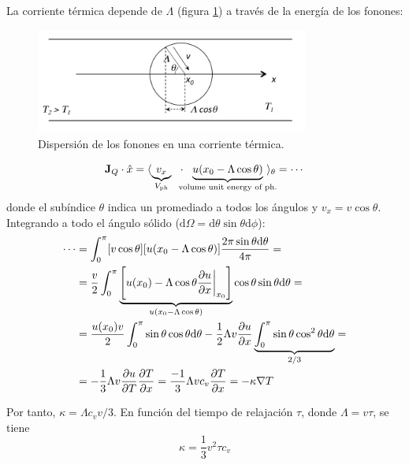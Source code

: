 La corriente térmica depende de $\Lambda$ (figura \ref{fig:jcurrent})
a través de la energía de los fonones:
\begin{figure}
  \centering
  \includegraphics[width=0.8\textwidth]{figures/jcurrent.png}
  \caption{Dispersión de los fonones en una corriente térmica.}
  \label{fig:jcurrent}
\end{figure}

\begin{equation}
  \mathbf{J}_Q \cdot \hat x = \langle
  \underbrace{v_x}_{\mathclap{V_\text{ph}}} \ \ \cdot \ \ \underbrace{u(x_0
  - \Lambda \cos \theta)}_{\mathclap{\text{volume unit energy of
      ph.}}} \ \rangle_\theta = \cdots
\end{equation}
donde el subíndice $\theta$ indica un promediado a todos los
ángulos y $v_x = v\cos \theta$. Integrando a todo el ángulo sólido
($\text{d} \Omega = \text{d}\theta \sin \theta \text{d}\phi$):
\begin{equation}
\begin{split}
  \cdots &= \int_0^{\pi} [v \cos \theta] [u(x_0 - \Lambda \cos \theta)] \frac{2\pi
           \sin \theta \text{d}\theta}{4\pi} = \\
         &=  \frac{v}{2} \int_0^\pi
           \underbrace{\left[ u(x_0) - \Lambda\cos \theta \frac{\partial
           u}{\partial x} \bigg|_{x_0} \right]}_{u(x_0 - \Lambda \cos
           \theta)} \cos \theta \sin \theta \text{d} \theta = \\
         &= \frac{u(x_0)v}{2} \int_0^\pi \sin \theta \cos \theta
           \text{d}\theta - \frac{1}{2} \Lambda v \frac{\partial u}{\partial x}{}
           \underbrace{\int_0^\pi \sin \theta \cos^2 \theta
           \text{d}\theta}_{2/3} = \\
         &= -\frac{1}{3} \Lambda v \frac{\partial u}{\partial T}{} \frac{\partial T}{\partial x}{} =
           \frac{-1}{3} \Lambda v c_v \frac{\partial T}{\partial x}{} = -\kappa \nabla T
\end{split}
\end{equation}

Por tanto, $\kappa = \Lambda c_v v / 3$. En función del tiempo de
relajación $\tau$, donde $\Lambda = v \tau$, se tiene
\begin{equation}
  \kappa = \frac{1}{3} v^2 \tau c_v
\end{equation}

